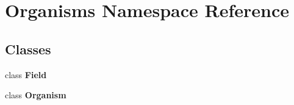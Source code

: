 \section{Organisms Namespace Reference}
\label{namespaceOrganisms}


\subsection*{Classes}
\begin{CompactItemize}
\item 
class \bf{Field}
\item 
class \bf{Organism}
\end{CompactItemize}
